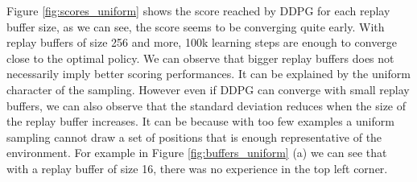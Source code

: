 \documentclass{article}
\begin{document}
Figure \ref{fig:scores_uniform} shows the score reached by DDPG for each replay buffer size, as we can see, the score seems to be converging quite early. With replay buffers of size 256 and more, 100k learning steps are enough to converge close to the optimal policy. We can observe that bigger replay buffers does not necessarily imply better scoring performances. It can be explained by the uniform character of the sampling. However even if DDPG can converge with small replay buffers, we can also observe that the standard deviation reduces when the size of the replay buffer increases. It can be because with too few examples a uniform sampling cannot draw a set of positions that is enough representative of the environment. For example in Figure \ref{fig:buffers_uniform} (a) we can see that with a replay buffer of size 16, there was no experience in the top left corner.
\end{document}
